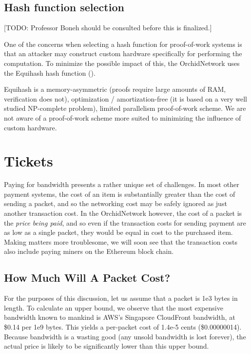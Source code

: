 \documentclass{article}
\newcommand{\orchid}{Orchid}
\newcommand{\Orchid}{\orchid}
\begin{document}
\subsection{Hash function selection}

[TODO: Professor Boneh should be consulted before this is finalized.]

One of the concerns when selecting a hash function for proof-of-work
systems is that an attacker may construct custom hardware specifically
for performing the computation. To minimize the possible impact of
this, the \Orchid Network uses the Equihash hash function
().

Equihash is a memory-asymmetric (proofs require large amounts of RAM,
verification does not), optimization / amortization-free (it is based on
a very well studied NP-complete problem), limited parallelism
proof-of-work scheme. We are not aware of a proof-of-work scheme more
suited to minimizing the influence of custom hardware.

\section{Tickets}
\label{sec:tickets}

Paying for bandwidth presents a rather unique set of challenges. In most other payment systems, the cost of an item is substantially greater than the cost of sending a packet, and so the networking cost may be safely ignored as just another transaction cost. In the \Orchid Network however, the cost of a packet is the \emph{price being paid}, and so even if the transaction costs for sending payment are as low as a single packet, they would be equal in cost to the purchased item. Making matters more troublesome, we will soon see that the transaction costs also include paying miners on the Ethereum block chain.

\subsection{How Much Will A Packet Cost?}

For the purposes of this discussion, let us assume that a packet is 1e3 bytes in length. To calculate an upper bound, we observe that the most expensive bandwidth known to mankind is AWS's Singapore CloudFront bandwidth, at \$0.14 per 1e9 bytes. This yields a per-packet cost of 1.4e-5 cents (\$0.00000014). Because bandwidth is a wasting good (any unsold bandwidth is lost forever), the actual price is likely to be significantly lower than this upper bound.
\end{document}
